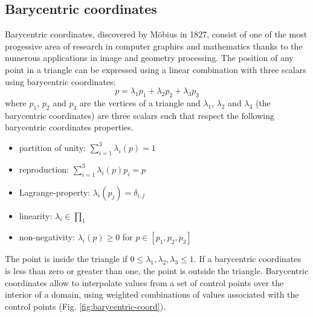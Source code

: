 \subsection{Barycentric coordinates}
Barycentric coordinates, discovered by Möbius in 1827, consist of one of the most progessive area of research in computer graphics and mathematics thanks to the numerous applications in image and geometry processing.
The position of any point in a triangle can be expressed using a linear combination with three scalars using barycentric coordinates:
$$ p = \lambda_1 p_1 + \lambda_2 p_2 + \lambda_3 p_3$$
where $p_1$, $p_2$ and $p_3$ are the vertices of a triangle and $\lambda_1$, $\lambda_2$ and $\lambda_3$ (the barycentric coordinates) are three scalars such that
respect the following barycentric coordinates properties.
\begin{itemize}
  \item partition of unity: $\sum_{i=1}^3 \lambda_{i}(p) = 1$
  \item reproduction: $\sum_{i=1}^3 \lambda_{i}(p)p_i = p$
  \item Lagrange-property: $\lambda_i(p_j) = \delta_{i, j}$
  \item linearity: $\lambda_i \in \prod_1$
  \item non-negativity: $\lambda_i(p)\geq 0$ for $p \in [p_1, p_2, p_3]$
\end{itemize}
The point is inside the triangle if $0 \leq \lambda_1, \lambda_2, \lambda_3 \leq 1$. If a barycentric coordinates is less than zero or greater than one, the point is outside the triangle.
Barycentric coordinates allow to interpolate values from a set of control points over the interior of a domain, using weighted combinations of values associated with the control points (Fig. \ref{fig:barycentric-coord}).

